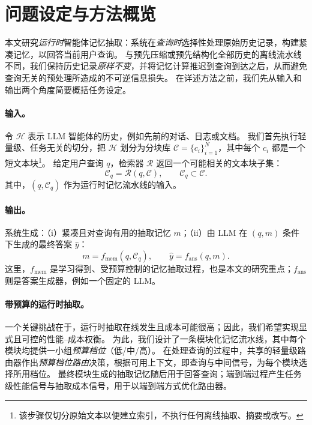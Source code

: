 \section{问题设定与方法概览}
\label{sec:overview}

本文研究\emph{运行时}智能体记忆抽取：系统在\emph{查询时}选择性处理原始历史记录，构建紧凑记忆，以回答当前用户查询。
与预先压缩或预先结构化全部历史的离线流水线不同，我们保持历史记录\emph{原样不变}，并将记忆计算推迟到查询到达之后，从而避免查询无关的预处理所造成的不可逆信息损失。
在详述方法之前，我们先从输入和输出两个角度简要概括任务设定。

\paragraph{输入。}
令 $\mathcal{H}$ 表示 LLM 智能体的历史，例如先前的对话、日志或文档。
我们首先执行轻量级、任务无关的切分，把 $\mathcal{H}$ 划分为分块库 $\mathcal{C}=\{c_i\}_{i=1}^{N}$，其中每个 $c_i$ 都是一个短文本块\footnote{该步骤仅切分原始文本以便建立索引，不执行任何离线抽取、摘要或改写。}。
给定用户查询 $q$，检索器 $\mathcal{R}$ 返回一个可能相关的文本块子集：
\begin{equation}
\mathcal{C}_q = \mathcal{R}(q, \mathcal{C}), \qquad \mathcal{C}_q \subset \mathcal{C}.
\end{equation}
其中，$(q, \mathcal{C}_q)$ 作为运行时记忆流水线的输入。

\paragraph{输出。}
系统生成：（i）紧凑且对查询有用的抽取记忆 $m$；（ii）由 LLM 在 $(q,m)$ 条件下生成的最终答案 $\hat{y}$：
\begin{equation}
m = f_{\text{mem}}(q, \mathcal{C}_q), \qquad \hat{y} = f_{\text{ans}}(q,m).
\end{equation}
这里，$f_{\text{mem}}$ 是学习得到、受预算控制的记忆抽取过程，也是本文的研究重点；$f_{\text{ans}}$ 则是答案生成器，例如一个固定的 LLM。

\paragraph{带预算的运行时抽取。}
一个关键挑战在于，运行时抽取在线发生且成本可能很高；因此，我们希望实现显式且可控的性能--成本权衡。
为此，我们设计了一条模块化记忆流水线，其中每个模块均提供一小组\emph{预算档位}（\textsc{低}/\textsc{中}/\textsc{高}）。
在处理查询的过程中，共享的轻量级路由器作出\emph{预算档位路由}决策，根据可用上下文，即查询与中间信号，为每个模块选择所用档位。
最终模块生成的抽取记忆随后用于回答查询；端到端过程产生任务级性能信号与抽取成本信号，用于以端到端方式优化路由器。

